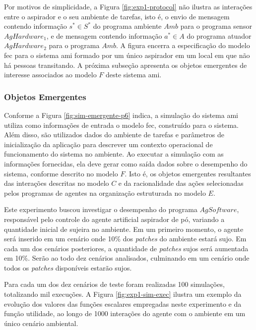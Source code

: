 Por motivos de simplicidade, a Figura \ref{fig:exp1-protocol} não ilustra as interações entre o aspirador e o seu ambiente de tarefas, isto é, o envio de mensagem contendo informação $s^* \in S^*$ do programa ambiente $Amb$ para o programa sensor $AgHardware_1$, e de mensagem contendo informação $a^* \in A$ do programa atuador $AgHardware_2$ para o programa $Amb$. A figura encerra a especificação do modelo \acrshort{fec} para o sistema \acrshort{ami} formado por um único aspirador em um local em que não há pessoas transitando. A próxima subseção apresenta os objetos emergentes de interesse associados ao modelo $F$ deste sistema \acrshort{ami}. 

\subsubsection{Objetos Emergentes}

Conforme a Figura \ref{fig:sim-emergente-p6} indica, a simulação do sistema \acrshort{ami} utiliza como informações de entrada o modelo \acrshort{fec}, construído para o sistema. Além disso, são utilizados dados do ambiente de tarefas e parâmetros de inicialização da aplicação para descrever um contexto operacional de funcionamento do sistema no ambiente. Ao executar a simulação com as informações fornecidas, ela deve gerar como saída dados sobre o desempenho do sistema, conforme descrito no modelo $F$. Isto é, os objetos emergentes resultantes das interações descritas no modelo $C$ e da racionalidade das ações selecionadas pelos programas de agentes na organização estruturada no modelo $E$.

Este experimento buscou investigar o desempenho do programa $AgSoftware$, responsável pelo controle do agente artificial aspirador de pó, variando a quantidade inicial de sujeira no ambiente. Em um primeiro momento, o agente será inserido em um cenário onde 10\% dos \textit{patches} do ambiente estará sujo. Em cada um dos cenários posteriores, a quantidade de \textit{patches} sujos será aumentada em 10\%. Serão ao todo dez cenários analisados, culminando em um cenário onde todos os \textit{patches} disponíveis estarão sujos. 

Para cada um dos dez cenários de teste foram realizadas 100 simulações, totalizando mil execuções. A Figura \ref{fig:exp1-sim-exec} ilustra um exemplo da evolução dos valores das funções escalares empregadas neste experimento e da função utilidade, ao longo de 1000 interações do agente com o ambiente em um único cenário ambiental. 

